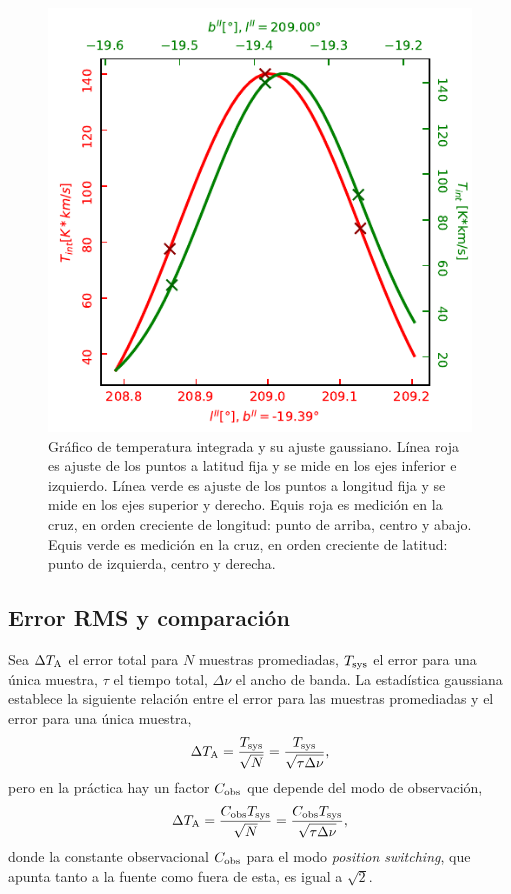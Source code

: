 \begin{figure}[p]
	\centering
	\includegraphics{tint.pdf}
	\caption{Gráfico de temperatura integrada y su ajuste gaussiano. Línea roja es ajuste de los puntos a latitud fija y se mide en los ejes inferior e izquierdo. Línea verde es ajuste de los puntos a longitud fija y se mide en los ejes superior y derecho. Equis roja es medición en la cruz, en orden creciente de longitud: punto de arriba, centro y abajo. Equis verde es medición en la cruz, en orden creciente de latitud: punto de izquierda, centro y derecha.}
	\label{fig:tint}
\end{figure}

\subsection{Error RMS y comparación}

Sea $\Delta T_\textnormal{A}$ el error total para $N$ muestras promediadas, $T_\textnormal{sys}$ el error para una única muestra, $\tau$ el tiempo total, $\Delta\nu$ el ancho de banda. La estadística gaussiana establece la siguiente relación entre el error para las muestras promediadas y el error para una única muestra,
\begin{equation}
\Delta T_\textnormal{A}=\frac{T_\textnormal{sys}}{\sqrt{N}}=\frac{T_\textnormal{sys}}{\sqrt{\tau\Delta\nu}}\label{eq:rms}
,\end{equation}
pero en la práctica hay un factor $C_\textnormal{obs}$ que depende del modo de observación,
\begin{equation}
\Delta T_\textnormal{A}=\frac{C_\textnormal{obs}T_\textnormal{sys}}{\sqrt{N}}=\frac{C_\textnormal{obs}T_\textnormal{sys}}{\sqrt{\tau\Delta\nu}}\label{eq:rms}
,\end{equation}
donde la constante observacional $C_\textnormal{obs}$ para el modo \textit{position switching}, que apunta tanto a la fuente como fuera de esta, es igual a $\sqrt{2}$.

